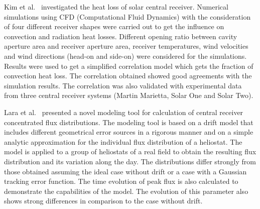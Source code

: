 Kim et al.~\cite{Kim2015} investigated the heat loss of solar central receiver. Numerical simulations using CFD (Computational Fluid Dynamics) with the consideration of four different receiver shapes were carried out to get the influence on convection and radiation heat losses. Different opening ratio between cavity aperture area and receiver aperture area, receiver temperatures, wind velocities and wind directions (head-on and side-on) were considered for the simulations. Results were used to get a simplified correlation model which gets the fraction of convection heat loss. The correlation obtained showed good agreements with the simulation results. The correlation was also validated with experimental data from three central receiver systems (Martin Marietta, Solar One and Solar Two).

Lara et al.~\cite{Lara2016} presented a novel modeling tool for calculation of central receiver concentrated flux distributions. The modeling tool is based on a drift model that includes different geometrical error sources in a rigorous manner and on a simple analytic approximation for the individual flux distribution of a heliostat. The model is applied to a group of heliostats of a real field to obtain the resulting flux distribution and its variation along the day. The distributions differ strongly from those obtained assuming the ideal case without drift or a case with a Gaussian tracking error function. The time evolution of peak flux is also calculated to demonstrate the capabilities of the model. The evolution of this parameter also shows strong differences in comparison to the case without drift.

%

